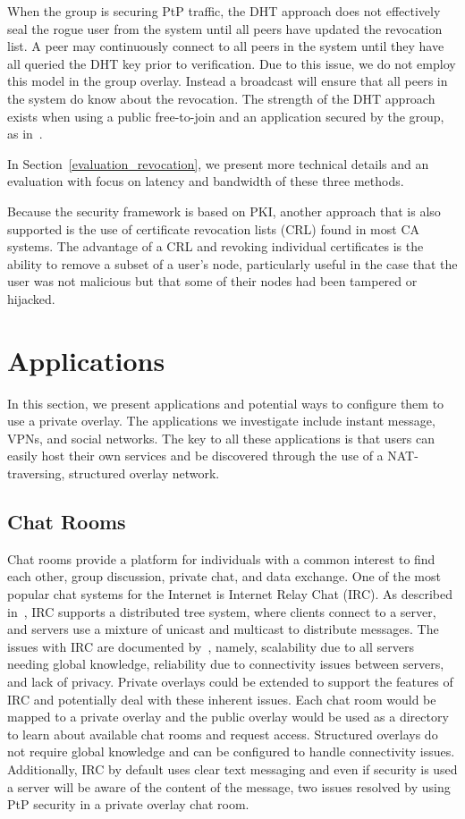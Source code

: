 \documentclass[conference]{IEEEtran}
\begin{document}
When the group is securing PtP traffic, the DHT approach does not effectively
seal the rogue user from the system until all peers have updated the revocation
list.  A peer may continuously connect to all peers in the system until they
have all queried the DHT key prior to verification.  Due to this issue, we do
not employ this model in the group overlay.  Instead a broadcast will ensure
that all peers in the system do know about the revocation.  The strength of
the DHT approach exists when using a public free-to-join and an application
secured by the group, as in~\cite{nsdi10}.

In Section~\ref{evaluation_revocation}, we present more technical details and
an evaluation with focus on latency and bandwidth of these three methods.  

Because the security framework is based on PKI, another approach that is also
supported is the use of certificate revocation lists
(CRL) found in most CA systems.  The advantage of a CRL and revoking individual
certificates is the ability to remove a subset of a user's node, particularly
useful in the case that the user was not malicious but that some of their nodes
had been tampered or hijacked.

\section{Applications}
\label{applications}
In this section, we present applications and potential ways to configure them
to use a private overlay.  The applications we investigate include instant
message, VPNs, and social networks.  The key to all these applications is that
users can easily host their own services and be discovered through the use of
a NAT-traversing, structured overlay network.

\subsection{Chat Rooms}
Chat rooms provide a platform for individuals with a common interest to find
each other, group discussion, private chat, and data exchange.  One of the most
popular chat systems for the Internet is Internet Relay Chat (IRC).  As
described in~\cite{irc}, IRC supports a distributed tree system, where clients
connect to a server, and servers use a mixture of unicast and multicast to
distribute messages.  The issues with IRC are documented by~\cite{irc_arch},
namely, scalability due to all servers needing global knowledge, reliability due
to connectivity issues between servers, and lack of privacy.  Private overlays
could be extended to support the features of IRC and potentially deal with these
inherent issues.  Each chat room would be mapped to a private overlay and the
public overlay would be used as a directory to learn about available chat rooms
and request access.  Structured overlays do not require global knowledge and can
be configured to handle connectivity issues.  Additionally, IRC by default uses
clear text messaging and even if security is used a server will be aware of the
content of the message, two issues resolved by using PtP security in a private
overlay chat room.  
\end{document}
